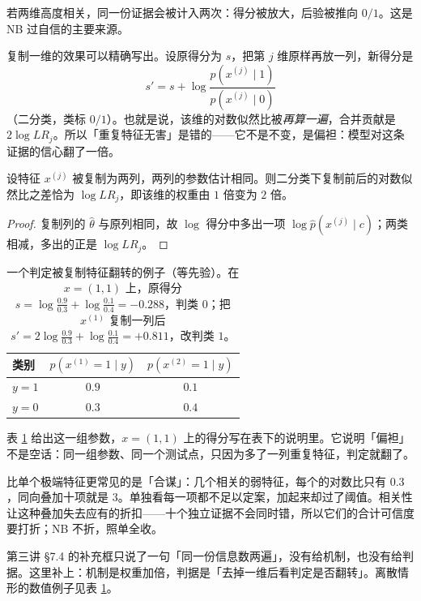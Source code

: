 \documentclass[11pt,a4paper,fontset=windows,zihao=-4]{ctexart}
\newcommand{\tabhead}{\sffamily\bfseries\color{navy}}
\begin{document}
若两维高度相关，同一份证据会被计入两次：得分被放大，后验被推向 $0/1$。这是 NB 过自信的主要来源。

复制一维的效果可以精确写出。设原得分为 $s$，把第 $j$ 维原样再放一列，新得分是
\[
  s'=s+\log\frac{p(x^{(j)}\mid 1)}{p(x^{(j)}\mid 0)}
\]
（二分类，类标 $0/1$）。也就是说，该维的对数似然比被\emph{再算一遍}，合并贡献是 $2\log LR_j$。所以「重复特征无害」是错的——它不是不变，是偏袒：模型对这条证据的信心翻了一倍。

\begin{prop}[复制一维等于双倍权重]
设特征 $x^{(j)}$ 被复制为两列，两列的参数估计相同。则二分类下复制前后的对数似然比之差恰为 $\log LR_j$，即该维的权重由 $1$ 倍变为 $2$ 倍。
\end{prop}

\begin{proof}
复制列的 $\hat\theta$ 与原列相同，故 $\log$ 得分中多出一项 $\log\hat p(x^{(j)}\mid c)$；两类相减，多出的正是 $\log LR_j$。
\end{proof}

\begin{table}[htbp]
\centering
\small
\begin{tabular}{@{}lcc@{}}
\toprule
\rowcolor{navy!7}
\tabhead 类别 & \tabhead $p(x^{(1)}=1\mid y)$ & \tabhead $p(x^{(2)}=1\mid y)$\\
\midrule
$y=1$ & $0.9$ & $0.1$\\
$y=0$ & $0.3$ & $0.4$\\
\bottomrule
\end{tabular}
\caption{一个判定被复制特征翻转的例子（等先验）。在 $x=(1,1)$ 上，原得分 $s=\log\frac{0.9}{0.3}+\log\frac{0.1}{0.4}=-0.288$，判类 $0$；把 $x^{(1)}$ 复制一列后 $s'=2\log\frac{0.9}{0.3}+\log\frac{0.1}{0.4}=+0.811$，改判类 $1$。}
\label{tab:dup}
\end{table}

表 \ref{tab:dup} 给出这一组参数，$x=(1,1)$ 上的得分写在表下的说明里。它说明「偏袒」不是空话：同一组参数、同一个测试点，只因为多了一列重复特征，判定就翻了。

比单个极端特征更常见的是「合谋」：几个相关的弱特征，每个的对数比只有 $0.3$，同向叠加十项就是 $3$。单独看每一项都不足以定案，加起来却过了阈值。相关性让这种叠加失去应有的折扣——十个独立证据不会同时错，所以它们的合计可信度要打折；NB 不折，照单全收。

\begin{add}[离散情形的补足]
第三讲 §7.4 的补充框只说了一句「同一份信息数两遍」，没有给机制，也没有给判据。这里补上：机制是权重加倍，判据是「去掉一维后看判定是否翻转」。离散情形的数值例子见表 \ref{tab:dup}。
\end{add}
\end{document}

